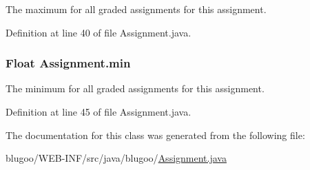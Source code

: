 The maximum for all graded assignments for this assignment. 



Definition at line 40 of file Assignment.java.\hypertarget{classAssignment_eedf9bd76e822f98da0b732882001575}{
\subsubsection{\setlength{\rightskip}{0pt plus 5cm}Float {\bf Assignment.min}}}
\label{classAssignment_eedf9bd76e822f98da0b732882001575}


The minimum for all graded assignments for this assignment. 



Definition at line 45 of file Assignment.java.

The documentation for this class was generated from the following file:\begin{CompactItemize}
\item 
blugoo/WEB-INF/src/java/blugoo/\hyperlink{Assignment_8java}{Assignment.java}\end{CompactItemize}
